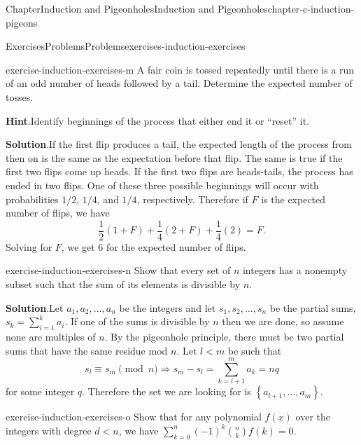 \documentclass[oneside,10pt,]{book}
\newcommand{\blocktitlefont}{\relax}
\numberwithin{equation}{section}
\newcommand{\lt}{<}
\begin{document}
\begin{chapterptx}{Chapter}{Induction and Pigeonholes}{}{Induction and Pigeonholes}{}{}{chapter-c-induction-pigeons}
\begin{exercises-section}{Exercises}{Problems}{}{Problems}{}{}{exercises-induction-exercises}
\begin{divisionexercise}{12}{}{}{exercise-induction-exercises-m}%
A fair coin is tossed repeatedly until there is a run of an odd number of heads followed by a tail. Determine the expected number of tosses.%
\par\smallskip%
\noindent\textbf{\blocktitlefont Hint}.\hypertarget{hint-induction-exercises-m-b}{}\quad{}Identify beginnings of the process that either end it or ``reset'' it.%
\par\smallskip%
\noindent\textbf{\blocktitlefont Solution}.\hypertarget{solution-induction-exercises-m-c}{}\quad{}If the first flip produces a tail, the expected length of the process from then on is the same as the expectation before that flip.   The same is true if the first two flips come up heads.  If the first two flips are heads-tails, the process has ended in two flips.  One of these three possible beginnings will occur with probabilities \(1/2\), \(1/4\), and \(1/4\), respectively.  Therefore if \(F\) is the expected number of flips, we have%
\begin{equation*}
\frac{1}{2} (1+F) +\frac{1}{4} (2+F) +\frac{1}{4} (2) = F\text{.}
\end{equation*}
Solving for \(F\), we get 6 for the expected number of flips.%
\end{divisionexercise}%
\begin{divisionexercise}{13}{}{}{exercise-induction-exercises-n}%
Show that every set of \(n\) integers has a nonempty subset such that the sum of its elements is divisible by \(n\).%
\par\smallskip%
\noindent\textbf{\blocktitlefont Solution}.\hypertarget{solution-induction-exercises-n-b}{}\quad{}Let \(a_1, a_2, \dots , a_n\) be the integers and let \(s_1, s_2, \dots , s_n\) be the partial sums, \(s_k=\sum _{i=1}^k
a_i\).  If one of the sums is divisible by \(n\) then we are done, so assume none are multiples of \(n\).  By the pigeonhole principle, there must be two partial sums that have the same residue mod \(n\).  Let \(l \lt m \) be such that%
\begin{equation*}
s_l\equiv s_m \pmod{n} \Rightarrow s_m-s_l= \sum _{k=l+1}^m a_k=n q
\end{equation*}
for some integer \(q\).  Therefore the set we are looking for is \(\left\{a_{l+1}, \ldots, a_m\right\}\).%
\end{divisionexercise}%
\begin{divisionexercise}{14}{}{}{exercise-induction-exercises-o}%
Show that for any polynomial \(f(x)\) over the integers with degree \(d\lt n\), we have \(\sum_{k=0}^{n} (-1)^k \binom{n}{k} f(k) = 0\).%

\end{divisionexercise}
\end{exercises-section}
\end{chapterptx}
\end{document}
